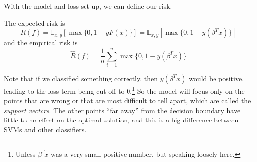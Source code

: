   With the model and loss set up, we can define our risk.

  \begin{theorem}[Risk]
    \label{thm:risk-3}
    The expected risk is 
    \begin{equation}
      R(f) = \mathbb{E}_{x, y} \left[ \max\{0, 1 - y F(x) \}\right] = \mathbb{E}_{x, y} \left[ \max\{0, 1 - y (\beta^T x) \}\right]
    \end{equation}
    and the empirical risk is 
    \begin{equation}
      \hat{R}(f) = \frac{1}{n} \sum_{i=1}^n \max\{0, 1 - y (\beta^T x) \}
    \end{equation}
  \end{theorem}
  
  Note that if we classified something correctly, then $y(\beta^T x)$ would be positive, leading to the loss term being cut off to $0$.\footnote{Unless $\beta^T x$ was a very small positive number, but speaking loosely here.} So the model will focus only on the points that are wrong or that are most difficult to tell apart, which are called the \textit{support vectors}. The other points ``far away'' from the decision boundary have little to no effect on the optimal solution, and this is a big difference between SVMs and other classifiers. 

